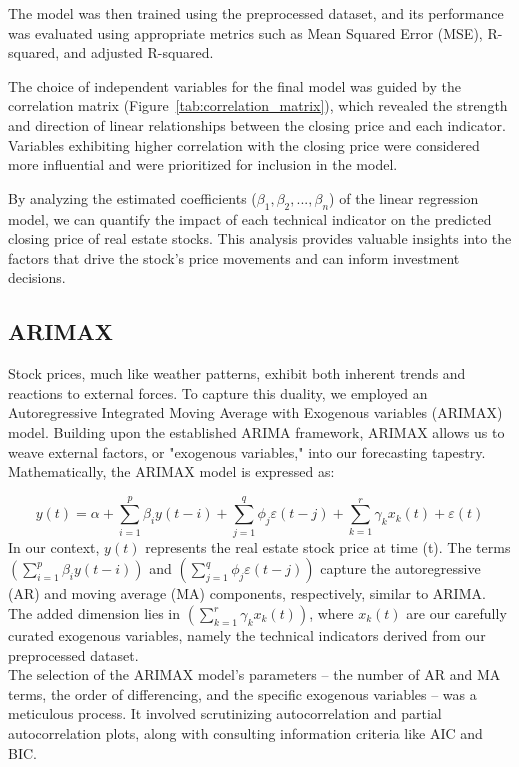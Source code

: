 \documentclass{ieeeojies}
\begin{document}
The model was then trained using the preprocessed dataset, and its performance was evaluated using appropriate metrics such as Mean Squared Error (MSE), R-squared, and adjusted R-squared.

The choice of independent variables for the final model was guided by the correlation matrix (Figure~\ref{tab:correlation_matrix}), which revealed the strength and direction of linear relationships between the closing price and each indicator. Variables exhibiting higher correlation with the closing price were considered more influential and were prioritized for inclusion in the model.

By analyzing the estimated coefficients (\( \beta_1, \beta_2, ..., \beta_n \)) of the linear regression model, we can quantify the impact of each technical indicator on the predicted closing price of real estate stocks. This analysis provides valuable insights into the factors that drive the stock's price movements and can inform investment decisions.
  \subsection{ARIMAX}
  Stock prices, much like weather patterns, exhibit both inherent trends and reactions to external forces. To capture this duality, we employed an Autoregressive Integrated Moving Average with Exogenous variables (ARIMAX) model. Building upon the established ARIMA framework, ARIMAX allows us to weave external factors, or "exogenous variables," into our forecasting tapestry.
  Mathematically, the ARIMAX model is expressed as:
  
  \[y(t) = \alpha + \sum_{i=1}^{p} \beta_i y(t-i) + \sum_{j=1}^{q} \phi_j \varepsilon(t-j) + \sum_{k=1}^{r} \gamma_k x_k(t) + \varepsilon(t)\]
In our context, $y(t)$ represents the real estate stock price at time (t). The terms  $(\sum_{i=1}^{p} \beta_i y(t-i))$ and $(\sum_{j=1}^{q} \phi_j \varepsilon(t-j))$ capture the autoregressive (AR) and moving average (MA) components, respectively, similar to ARIMA. The added dimension lies in $(\sum_{k=1}^{r} \gamma_k x_k(t))$, where $x_k(t)$ are our carefully curated exogenous variables, namely the technical indicators derived from our preprocessed dataset.\\

The selection of the ARIMAX model's parameters – the number of AR and MA terms, the order of differencing, and the specific exogenous variables – was a meticulous process. It involved scrutinizing autocorrelation and partial autocorrelation plots, along with consulting information criteria like AIC and BIC.\\
\end{document}
